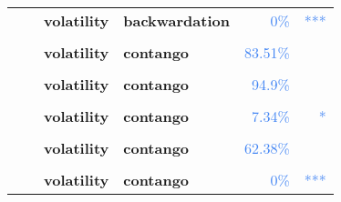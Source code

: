 \documentclass[
  authoryear,
  preprint,
  3p]{elsarticle}
\begin{document}
\begin{longtable}[t]{>{}l>{}l>{}l>{}l>{}r>{}r}
\textbf{} & \textbf{} & \textbf{volatility} & \textbf{backwardation} & \textcolor[HTML]{4285f4}{0\%} & \textcolor[HTML]{4285f4}{\vphantom{6} ***}\\
\textbf{\cellcolor{gray!10}{}} & \textbf{\cellcolor{gray!10}{crisis}} & \textbf{\cellcolor{gray!10}{mean}} & \textbf{\cellcolor{gray!10}{contango}} & \textcolor[HTML]{4285f4}{\cellcolor{gray!10}{76.2\%}} & \textcolor[HTML]{4285f4}{\cellcolor{gray!10}{}}\\
\addlinespace
\textbf{} & \textbf{} & \textbf{volatility} & \textbf{contango} & \textcolor[HTML]{4285f4}{83.51\%} & \textcolor[HTML]{4285f4}{}\\
\textbf{\cellcolor{gray!10}{}} & \textbf{\cellcolor{gray!10}{post-crisis}} & \textbf{\cellcolor{gray!10}{mean}} & \textbf{\cellcolor{gray!10}{backwardation}} & \textcolor[HTML]{4285f4}{\cellcolor{gray!10}{91.81\%}} & \textcolor[HTML]{4285f4}{\cellcolor{gray!10}{}}\\
\textbf{} & \textbf{} & \textbf{volatility} & \textbf{contango} & \textcolor[HTML]{4285f4}{94.9\%} & \textcolor[HTML]{4285f4}{}\\
\textbf{\cellcolor{gray!10}{Cattle-feeder (XCME)}} & \textbf{\cellcolor{gray!10}{past}} & \textbf{\cellcolor{gray!10}{mean}} & \textbf{\cellcolor{gray!10}{backwardation}} & \textcolor[HTML]{4285f4}{\cellcolor{gray!10}{76.82\%}} & \textcolor[HTML]{4285f4}{\cellcolor{gray!10}{}}\\
\textbf{} & \textbf{} & \textbf{volatility} & \textbf{contango} & \textcolor[HTML]{4285f4}{7.34\%} & \textcolor[HTML]{4285f4}{*}\\
\addlinespace
\textbf{\cellcolor{gray!10}{}} & \textbf{\cellcolor{gray!10}{financialisation}} & \textbf{\cellcolor{gray!10}{mean}} & \textbf{\cellcolor{gray!10}{backwardation}} & \textcolor[HTML]{4285f4}{\cellcolor{gray!10}{6.35\%}} & \textcolor[HTML]{4285f4}{\cellcolor{gray!10}{*}}\\
\textbf{} & \textbf{} & \textbf{volatility} & \textbf{contango} & \textcolor[HTML]{4285f4}{62.38\%} & \textcolor[HTML]{4285f4}{}\\
\textbf{\cellcolor{gray!10}{}} & \textbf{\cellcolor{gray!10}{crisis}} & \textbf{\cellcolor{gray!10}{mean}} & \textbf{\cellcolor{gray!10}{backwardation}} & \textcolor[HTML]{4285f4}{\cellcolor{gray!10}{99.19\%}} & \textcolor[HTML]{4285f4}{\cellcolor{gray!10}{}}\\
\textbf{} & \textbf{} & \textbf{volatility} & \textbf{contango} & \textcolor[HTML]{4285f4}{0\%} & \textcolor[HTML]{4285f4}{\vphantom{28} ***}\\

\end{longtable}
\end{document}

